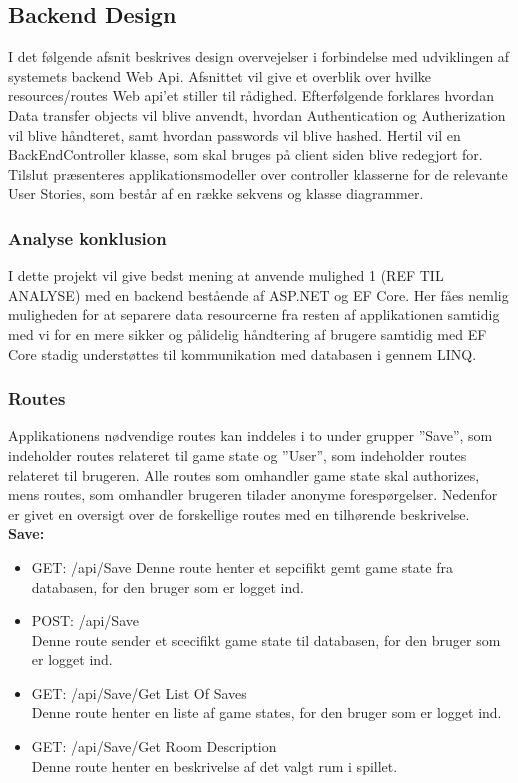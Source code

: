 \subsection{Backend Design}

I det følgende afsnit beskrives design overvejelser i forbindelse med udviklingen af systemets backend Web Api. Afsnittet vil give et overblik over hvilke resources/routes Web api’et stiller til rådighed. Efterfølgende forklares hvordan Data transfer objects vil blive anvendt, hvordan Authentication og Autherization vil blive håndteret, samt hvordan passwords vil blive hashed. Hertil vil en BackEndController klasse, som skal bruges på client siden blive redegjort for. Tilslut præsenteres applikationsmodeller over controller klasserne for de relevante User Stories, som består af en række sekvens og klasse diagrammer.\\

\subsubsection{Analyse konklusion}
I dette projekt vil give bedst mening at anvende mulighed 1 (REF TIL ANALYSE) med en backend bestående af ASP.NET og EF Core. Her fåes nemlig muligheden for at separere data resourcerne fra resten af applikationen samtidig med vi for en mere sikker og pålidelig håndtering af brugere samtidig med EF Core stadig understøttes til kommunikation med databasen i gennem LINQ.\cite{Language Integrated Query}\\

\subsubsection{Routes}
Applikationens nødvendige routes kan inddeles i to under grupper ”Save”, som indeholder routes relateret til game state og ”User”, som indeholder routes relateret til brugeren. Alle routes som omhandler game state skal authorizes, mens routes, som omhandler brugeren tilader anonyme forespørgelser. Nedenfor er givet en oversigt over de forskellige routes med en tilhørende beskrivelse.\\

\textbf{Save:}\\
\begin{itemize}
\item GET: /api/Save
Denne route henter et sepcifikt gemt game state fra databasen, for den bruger som er logget ind.
\item POST: /api/Save\\
Denne route sender et scecifikt game state til databasen, for den bruger som er logget ind.
\item GET: /api/Save/Get List Of Saves\\
Denne route henter en liste af game states, for den bruger som er logget ind. 
\item GET: /api/Save/Get Room Description\\
Denne route henter en beskrivelse af det valgt rum i spillet.
\end{itemize}

